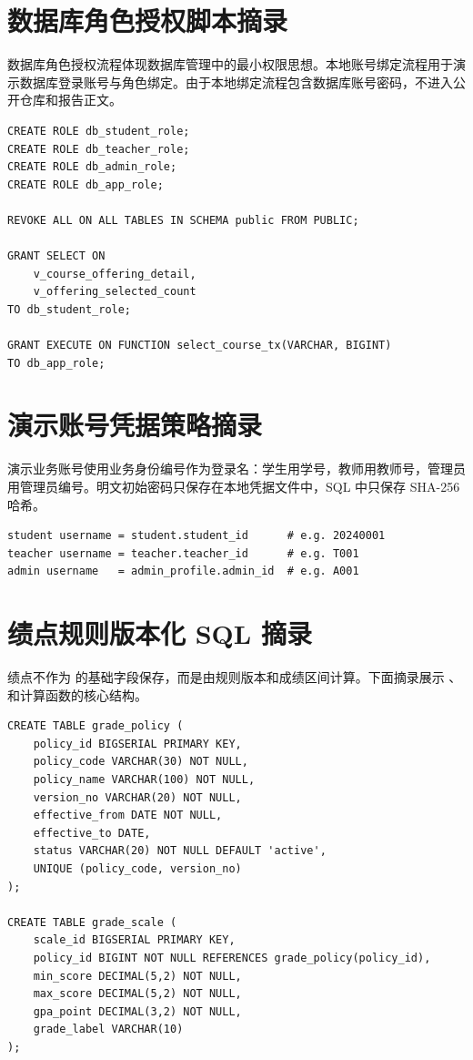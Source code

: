 \section{数据库角色授权脚本摘录}

数据库角色授权流程体现数据库管理中的最小权限思想。本地账号绑定流程用于演示数据库登录账号与角色绑定。由于本地绑定流程包含数据库账号密码，不进入公开仓库和报告正文。

\begin{lstlisting}[style=sqlstyle]
CREATE ROLE db_student_role;
CREATE ROLE db_teacher_role;
CREATE ROLE db_admin_role;
CREATE ROLE db_app_role;

REVOKE ALL ON ALL TABLES IN SCHEMA public FROM PUBLIC;

GRANT SELECT ON
    v_course_offering_detail,
    v_offering_selected_count
TO db_student_role;

GRANT EXECUTE ON FUNCTION select_course_tx(VARCHAR, BIGINT)
TO db_app_role;
\end{lstlisting}

\section{演示账号凭据策略摘录}

演示业务账号使用业务身份编号作为登录名：学生用学号，教师用教师号，管理员用管理员编号。明文初始密码只保存在本地凭据文件中，SQL 中只保存 SHA-256 哈希。

\begin{lstlisting}[style=codestyle]
student username = student.student_id      # e.g. 20240001
teacher username = teacher.teacher_id      # e.g. T001
admin username   = admin_profile.admin_id  # e.g. A001
\end{lstlisting}

\section{绩点规则版本化 SQL 摘录}

绩点不作为  的基础字段保存，而是由规则版本和成绩区间计算。下面摘录展示 、 和计算函数的核心结构。

\begin{lstlisting}[style=sqlstyle]
CREATE TABLE grade_policy (
    policy_id BIGSERIAL PRIMARY KEY,
    policy_code VARCHAR(30) NOT NULL,
    policy_name VARCHAR(100) NOT NULL,
    version_no VARCHAR(20) NOT NULL,
    effective_from DATE NOT NULL,
    effective_to DATE,
    status VARCHAR(20) NOT NULL DEFAULT 'active',
    UNIQUE (policy_code, version_no)
);

CREATE TABLE grade_scale (
    scale_id BIGSERIAL PRIMARY KEY,
    policy_id BIGINT NOT NULL REFERENCES grade_policy(policy_id),
    min_score DECIMAL(5,2) NOT NULL,
    max_score DECIMAL(5,2) NOT NULL,
    gpa_point DECIMAL(3,2) NOT NULL,
    grade_label VARCHAR(10)
);
\end{lstlisting}

